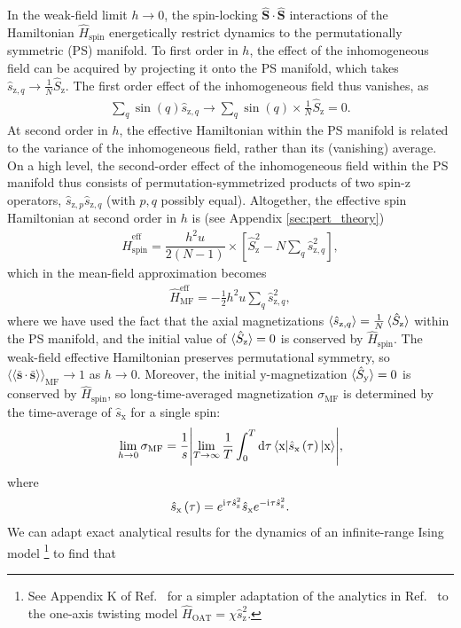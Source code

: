 \documentclass[aps,pra,nofootinbib,twocolumn,superscriptaddress]{revtex4-2}
\renewcommand{\t}{\text} %
\newcommand{\f}[2]{\dfrac{#1}{#2}} %
\newcommand{\p}[1]{\left(#1\right)} %
\renewcommand{\sp}[1]{\left[#1\right]} %
\newcommand{\bk}{\braket} %
\renewcommand{\v}{\bm} %
\renewcommand{\dd}{\text{d}} %
\renewcommand{\i}{\mathrm{i}\mkern1mu} %
\newcommand{\bbk}[1]{\langle\!\langle #1 \rangle\!\rangle}
\newcommand{\1}{\mathds{1}}
\newcommand{\s}{\hat s}
\renewcommand{\H}{\hat H}
\renewcommand{\S}{\hat S}
\newcommand{\x}{\text{x}}
\newcommand{\y}{\text{y}}
\newcommand{\z}{\text{z}}
\newcommand{\spin}{\text{spin}}
\newcommand{\eff}{\text{eff}}
\newcommand{\MF}{\text{MF}}
\newcommand{\sds}{\bar{\v s}\cdot\bar{\v s}}
\begin{document}
In the weak-field limit $h\to0$, the spin-locking $\v\S\cdot\v\S$ interactions of the Hamiltonian $\H_\spin$ energetically restrict dynamics to the permutationally symmetric (PS) manifold.
To first order in $h$, the effect of the inhomogeneous field can be acquired by projecting it onto the PS manifold, which takes $\s_{\z,q}\to\frac1N\S_\z$.
The first order effect of the inhomogeneous field thus vanishes, as
\begin{align}
  \sum_q \sin\p{q} \s_{\z,q}
  \to \sum_q \sin\p{q} \times \frac1N \S_\z
  = 0.
\end{align}
At second order in $h$, the effective Hamiltonian within the PS manifold is related to the variance of the inhomogeneous field, rather than its (vanishing) average.
On a high level, the second-order effect of the inhomogeneous field within the PS manifold thus consists of permutation-symmetrized products of two spin-z operators, $\s_{\z,p}\s_{\z,q}$ (with $p,q$ possibly equal).
Altogether, the effective spin Hamiltonian at second order in $h$ is (see Appendix \ref{sec:pert_theory})
\begin{align}
  \H_\spin^\eff
  = \f{h^2 u}{2(N-1)} \times \sp{\S_\z^2 - N\sum_q \s_{\z,q}^2},
  \label{eq:H_spin_eff}
\end{align}
which in the mean-field approximation becomes
\begin{align}
  \H_\MF^\eff = -\frac12 h^2 u \sum_q \s_{\z,q}^2,
\end{align}
where we have used the fact that the axial magnetizations $\bk{\s_{\z,q}}=\frac1N\bk{\S_\z}$ within the PS manifold, and the initial value of $\bk{\S_\z}=0$ is conserved by $\H_\spin$.
The weak-field effective Hamiltonian preserves permutational symmetry, so $\bbk{\sds}_\MF\to1$ as $h\to0$.
Moreover, the initial y-magnetization $\bk{\S_\y}=0$ is conserved by $\H_\spin$, so long-time-averaged magnetization $\sigma_\MF$ is determined by the time-average of $\s_\x$ for a single spin:
\begin{align}
  \lim_{h\to0} \sigma_\MF
  = \f1s \abs{\lim_{T\to\infty} \f1T \int_0^T \dd\tau
  \bk{\x|\s_\x\p{\tau}|\x}},
\end{align}
where
\begin{align}
  \s_\x\p{\tau} = e^{\i\tau \s_\z^2} \s_\x e^{-\i\tau \s_\z^2}.
\end{align}
We can adapt exact analytical results for the dynamics of an infinite-range Ising model \cite{foss-feig2013nonequilibrium}\footnote{See Appendix K of Ref.~\cite{perlin2020shorttime} for a simpler adaptation of the analytics in Ref.~\cite{foss-feig2013nonequilibrium} to the one-axis twisting model $\H_{\t{OAT}}=\chi \s_\z^2$.} to find that
\end{document}
